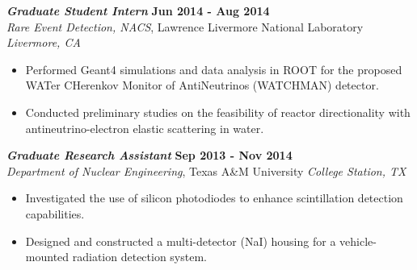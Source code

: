 {\sl\bf Graduate Student Intern} \hfill {\bf Jun 2014 - Aug 2014} \\
{\sl Rare Event Detection, NACS}, Lawrence Livermore National Laboratory \hfill {\sl Livermore, CA} \\[-2.8ex]
\vspace{2pt}
\begin{itemize}[leftmargin=4ex] \itemsep -2pt
\item Performed Geant4 simulations and data analysis in ROOT for the proposed WATer CHerenkov Monitor of AntiNeutrinos (WATCHMAN) detector.
\item Conducted preliminary studies on the feasibility of reactor directionality with antineutrino-electron elastic scattering in water.
\end{itemize}

{\sl\bf Graduate Research Assistant} \hfill {\bf Sep 2013 - Nov 2014} \\
{\sl Department of Nuclear Engineering}, Texas A\&M University \hfill {\sl College Station, TX} \\[-2.8ex]
\vspace{2pt}
\begin{itemize}[leftmargin=4ex] \itemsep -2pt
\item Investigated the use of silicon photodiodes to enhance scintillation detection capabilities.
\item Designed and constructed a multi-detector (NaI) housing for a vehicle-mounted radiation detection system.
\end{itemize} 
